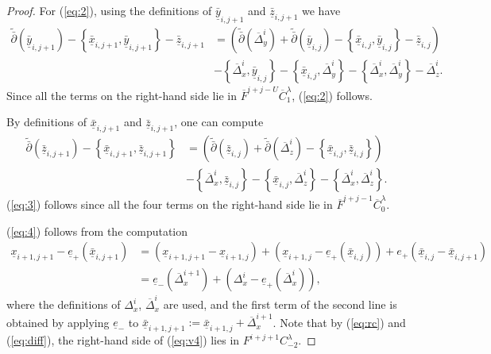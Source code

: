 \documentclass[a4paper]{article}
\numberwithin{equation}{section}
\begin{document}
\begin{proof}
For (\ref{eq:2}), using the definitions of $\bar{\underline{y}}_{i,j+1}$ and $\bar{\underline{z}}_{i,j+1}$ we have
\begin{equation}
\begin{split}
\tilde{\bar{\partial}}(\bar{\underline{y}}_{i,j+1})-\left\{\bar{\underline{x}}_{i,j+1},\bar{\underline{y}}_{i,j+1}\right\}-\bar{\underline{z}}_{i,j+1}&=\left(\tilde{\bar{\partial}}(\overline{\Delta}_y^i)+\tilde{\bar{\partial}}(\bar{\underline{y}}_{i,j})-\left\{\bar{\underline{x}}_{i,j},\bar{\underline{y}}_{i,j}\right\}-\bar{\underline{z}}_{i,j}\right) \\
&-\left\{\overline{\Delta}_x^i,\bar{\underline{y}}_{i,j}\right\}-\left\{\bar{\underline{x}}_{i,j},\overline{\Delta}_y^i\right\}-\left\{\overline{\Delta}_x^i,\overline{\Delta}_y^i\right\}-\overline{\Delta}_z^i.
\end{split}
\end{equation}
Since all the terms on the right-hand side lie in $\overline{F}^{i+j-U}\overline{C}_1^\lambda$, (\ref{eq:2}) follows.

By definitions of $\bar{\underline{x}}_{i,j+1}$ and $\bar{\underline{z}}_{i,j+1}$, one can compute
\begin{equation}
\begin{split}
\tilde{\bar{\partial}}(\bar{\underline{z}}_{i,j+1})-\left\{\bar{\underline{x}}_{i,j+1},\bar{\underline{z}}_{i,j+1}\right\}&=\left(\tilde{\bar{\partial}}(\bar{\underline{z}}_{i,j})+\tilde{\bar{\partial}}(\overline{\Delta}_z^i)-\left\{\bar{\underline{x}}_{i,j},\bar{\underline{z}}_{i,j}\right\}\right) \\
&-\left\{\overline{\Delta}_x^i,\bar{\underline{z}}_{i,j}\right\}-\left\{\bar{\underline{x}}_{i,j},\overline{\Delta}_z^i\right\}-\left\{\overline{\Delta}_x^i,\overline{\Delta}_z^i\right\}.
\end{split}
\end{equation}
(\ref{eq:3}) follows since all the four terms on the right-hand side lie in $\overline{F}^{i+j-1}\overline{C}_0^\lambda$.

(\ref{eq:4}) follows from the computation
\begin{equation}\label{eq:v4}
\begin{split}
\underline{x}_{i+1,j+1}-\underline{e}_+(\bar{\underline{x}}_{i,j+1})&=(\underline{x}_{i+1,j+1}-\underline{x}_{i+1,j})+\left(\underline{x}_{i+1,j}-\underline{e}_+(\bar{\underline{x}}_{i,j})\right)+e_+(\bar{\underline{x}}_{i,j}-\bar{\underline{x}}_{i,j+1}) \\
&=\underline{e}_-(\overline{\Delta}_x^{i+1})+\left(\Delta_x^i-\underline{e}_+(\overline{\Delta}_x^i)\right),
\end{split}
\end{equation}
where the definitions of $\Delta_x^i$, $\overline{\Delta}_x^i$ are used, and the first term of the second line is obtained by applying $\underline{e}_-$ to $\bar{\underline{x}}_{i+1,j+1}:=\bar{\underline{x}}_{i+1,j}+\overline{\Delta}_x^{i+1}$. Note that by (\ref{eq:rc}) and (\ref{eq:diff}), the right-hand side of (\ref{eq:v4}) lies in $F^{i+j+1}C_{-2}^\lambda$.


\end{proof}
\end{document}
